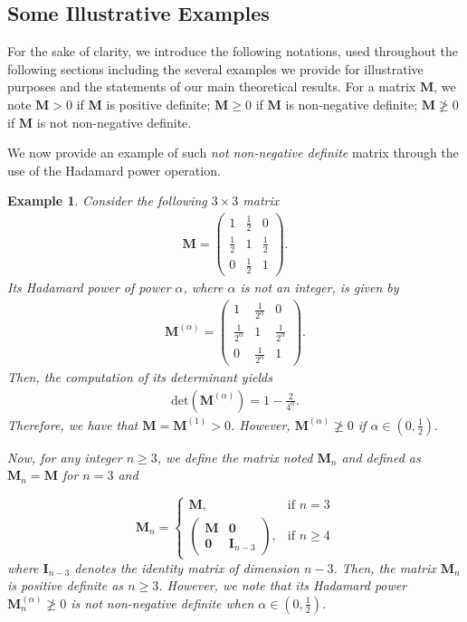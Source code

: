 \documentclass[conference,letterpaper]{IEEEtran}
\numberwithin{equation}{section}
\newcommand{\beaa}{\begin{eqnarray*}}
\newcommand{\eeaa}{\end{eqnarray*}}
\newtheorem{example}{{\sc Example}}[section]
\begin{document}
\subsection{Some Illustrative Examples}
For the sake of clarity, we introduce the following notations, used throughout the following sections including the several examples we provide for illustrative purposes and the statements of our main theoretical results.  
For a matrix $\mathbf{M}$, we note $\mathbf{M}>0$ if $\mathbf{M}$ is positive definite; $\mathbf{M}\geq 0$ if $\mathbf{M}$ is non-negative definite; $\mathbf{M}\ngeqslant 0$ if $\mathbf{M}$ is not non-negative definite.

We now provide an example of such \emph{not non-negative definite} matrix through the use of the Hadamard power operation.
\medskip
\begin{example} Consider  the following $3\times 3$ matrix
\beaa
\mathbf{M}=
\begin{pmatrix}
1 & \frac{1}{2} & 0\\
\frac{1}{2} & 1 & \frac{1}{2}\\
0 & \frac{1}{2} & 1
\end{pmatrix}
.
\eeaa
Its Hadamard power of power $\alpha$, where $\alpha$ is not an integer, is given by
\beaa
\mathbf{M}^{(\alpha)}=
\begin{pmatrix}
1 & \frac{1}{2^{\alpha}} & 0\\
\frac{1}{2^{\alpha}} & 1 & \frac{1}{2^{\alpha}}\\
0 & \frac{1}{2^{\alpha}} & 1
\end{pmatrix}
.
\eeaa
 Then, the computation of its determinant yields
\beaa
\mbox{det}(\mathbf{M}^{(\alpha)})=1-\frac{2}{4^{\alpha}}.
\eeaa
Therefore, we have that $\mathbf{M}=\mathbf{M}^{(1)}>0$. 
However, $\mathbf{M}^{(\alpha)}\ngeqslant 0$ if $\alpha \in (0, \frac{1}{2}).$

Now, for any integer $n\geq 3$, we define the matrix noted $\mathbf{M}_n$ and defined as 
$\mathbf{M}_n=\mathbf{M}$ for $n=3$ and

\[
    \mathbf{M}_n= 
\begin{cases}
    \mathbf{M},& \text{if } n=3\\
    \begin{pmatrix}
\mathbf{M} & \mathbf{0}\\
\mathbf{0} & \mathbf{I}_{n-3}
\end{pmatrix},              & \text{if } n\geq 4
\end{cases}
\]
where $\mathbf{I}_{n-3}$ denotes the identity matrix of dimension $n-3$.
Then,  the matrix $\mathbf{M}_n$ is positive definite as $n\geq 3$. 
However, we note that its Hadamard power $\mathbf{M}_n^{(\alpha)}\ngeqslant 0$ is not non-negative definite when $\alpha \in (0, \frac{1}{2})$.
\end{example}
\end{document}
